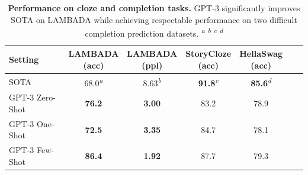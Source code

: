 \begin{table}
    \centering
    \begin{center}
        \begin{tabular}{l c c c c c c}
        \toprule
        Setting & \shortstack{LAMBADA\\(acc)} & \shortstack{LAMBADA\\(ppl)} & \shortstack{StoryCloze\\(acc)} & \shortstack{HellaSwag\\(acc)}\\ 
        \midrule
        SOTA & 68.0\textsuperscript{\textit{a}} & 8.63\textsuperscript{\textit{b}}  & \textbf{91.8}\textsuperscript{\textit{c}} & \textbf{85.6}\textsuperscript{\textit{d}}\\ 
        GPT-3 Zero-Shot & \textbf{76.2} & \textbf{3.00}   & 83.2 & 78.9\\
        GPT-3 One-Shot & \textbf{72.5} &\textbf{3.35} &  84.7 & 78.1\\
        GPT-3 Few-Shot & \textbf{86.4} & \textbf{1.92} & 87.7 & 79.3\\
        \bottomrule
        \end{tabular}
    \end{center}
    \caption{\textbf{Performance on cloze and completion tasks.} GPT-3 significantly improves SOTA on LAMBADA while achieving respectable performance on two difficult completion prediction datasets. \textsuperscript{\textit{a}}\cite{turing_17m} \textsuperscript{\textit{b}}\cite{radford2019language} \textsuperscript{\textit{c}}\cite{li2019story} \textsuperscript{\textit{d}}\cite{liu2020alum} }
    \label{table:completion}
\end{table}